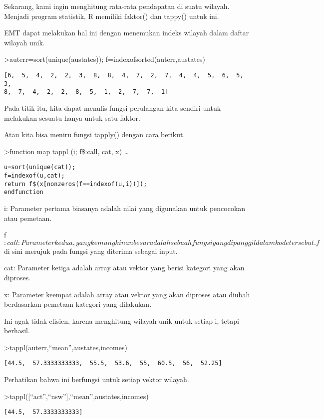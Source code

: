 \documentclass[
]{book}
\begin{document}
Sekarang, kami ingin menghitung rata-rata pendapatan di suatu wilayah. Menjadi program statistik, R memiliki faktor() dan tappy() untuk ini.

EMT dapat melakukan hal ini dengan menemukan indeks wilayah dalam daftar wilayah unik.

\textgreater auterr=sort(unique(austates)); f=indexofsorted(auterr,austates)

\begin{verbatim}
[6,  5,  4,  2,  2,  3,  8,  8,  4,  7,  2,  7,  4,  4,  5,  6,  5,  3,
8,  7,  4,  2,  2,  8,  5,  1,  2,  7,  7,  1]
\end{verbatim}

Pada titik itu, kita dapat menulis fungsi perulangan kita sendiri untuk melakukan sesuatu hanya untuk satu faktor.

Atau kita bisa meniru fungsi tapply() dengan cara berikut.

\textgreater function map tappl (i; f\$:call, cat, x) \ldots{}

\begin{verbatim}
u=sort(unique(cat));
f=indexof(u,cat);
return f$(x[nonzeros(f==indexof(u,i))]);
endfunction
\end{verbatim}

i: Parameter pertama biasanya adalah nilai yang digunakan untuk pencocokan atau pemetaan.

f\(:call: Parameter kedua, yang kemungkinan besar adalah sebuah fungsi
yang dipanggil dalam kode tersebut. f\) di sini merujuk pada fungsi yang diterima sebagai input.

cat: Parameter ketiga adalah array atau vektor yang berisi kategori yang akan diproses.

x: Parameter keempat adalah array atau vektor yang akan diproses atau diubah berdasarkan pemetaan kategori yang dilakukan.

Ini agak tidak efisien, karena menghitung wilayah unik untuk setiap i, tetapi berhasil.

\textgreater tappl(auterr,``mean'',austates,incomes)

\begin{verbatim}
[44.5,  57.3333333333,  55.5,  53.6,  55,  60.5,  56,  52.25]
\end{verbatim}

Perhatikan bahwa ini berfungsi untuk setiap vektor wilayah.

\textgreater tappl({[}``act'',``nsw''{]},``mean'',austates,incomes)

\begin{verbatim}
[44.5,  57.3333333333]
\end{verbatim}
\end{document}
